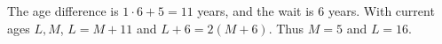 The age difference is $ 1\cdot6+5=11 $ years, and the wait is 6 years. With current ages $ L,M $, $ L=M+11 $ and $ L+6=2(M+6)$. Thus $ M=5 $ and $\boxed{L=16}$.
